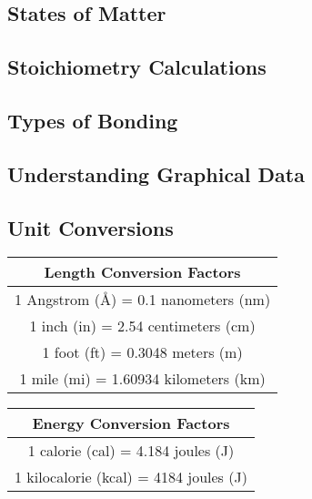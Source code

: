\documentclass[10pt, roman]{article}
\begin{document}
\subsection{States of Matter}
\subsection{Stoichiometry Calculations}
\subsection{Types of Bonding}
\subsection{Understanding Graphical Data}
\newpage
\subsection{Unit Conversions}
\begin{minipage}{.5\textwidth}
\centering
\begin{tabular}{|c|}
\hline
\textbf{Length Conversion Factors} \\
\hline
1 Angstrom (Å) = 0.1 nanometers (nm) \\
1 inch (in) = 2.54 centimeters (cm) \\
1 foot (ft) = 0.3048 meters (m) \\
1 mile (mi) = 1.60934 kilometers (km) \\
\hline
\end{tabular}
\end{minipage}%
\begin{minipage}{.5\textwidth}
\centering
\begin{tabular}{|c|}
\hline
\textbf{Energy Conversion Factors} \\
\hline
1 calorie (cal) = 4.184 joules (J) \\
1 kilocalorie (kcal) = 4184 joules (J) \\
\hline
\end{tabular}
\end{minipage}

\vspace{10pt}
\end{document}
